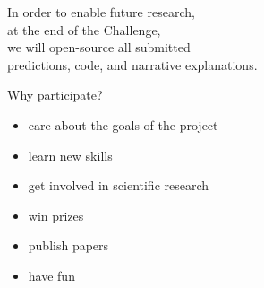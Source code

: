 \documentclass{beamer}
\begin{document}
\begin{frame}

\Large{
\begin{center}
In order to enable future research,\\at the end of the Challenge,\\we will open-source all submitted\\predictions, code, and narrative explanations.
\end{center}
}

\end{frame}
\begin{frame}

Why participate?
\begin{itemize}
\pause
\item care about the goals of the project
\pause
\item learn new skills
\pause
\item get involved in scientific research
\pause
\item win prizes
\pause
\item publish papers
\pause
\item have fun
\end{itemize}

\end{frame}
\end{document}
